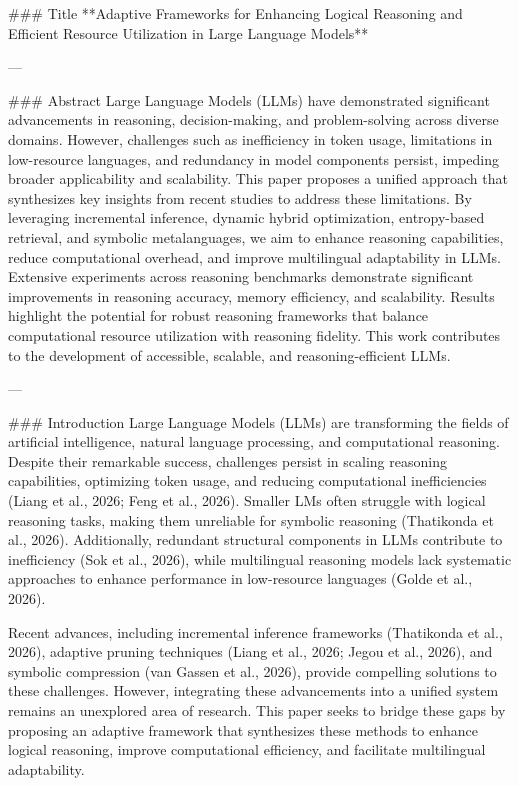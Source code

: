 ### Title  
**Adaptive Frameworks for Enhancing Logical Reasoning and Efficient Resource Utilization in Large Language Models**

---

### Abstract  
Large Language Models (LLMs) have demonstrated significant advancements in reasoning, decision-making, and problem-solving across diverse domains. However, challenges such as inefficiency in token usage, limitations in low-resource languages, and redundancy in model components persist, impeding broader applicability and scalability. This paper proposes a unified approach that synthesizes key insights from recent studies to address these limitations. By leveraging incremental inference, dynamic hybrid optimization, entropy-based retrieval, and symbolic metalanguages, we aim to enhance reasoning capabilities, reduce computational overhead, and improve multilingual adaptability in LLMs. Extensive experiments across reasoning benchmarks demonstrate significant improvements in reasoning accuracy, memory efficiency, and scalability. Results highlight the potential for robust reasoning frameworks that balance computational resource utilization with reasoning fidelity. This work contributes to the development of accessible, scalable, and reasoning-efficient LLMs.

---

### Introduction  
Large Language Models (LLMs) are transforming the fields of artificial intelligence, natural language processing, and computational reasoning. Despite their remarkable success, challenges persist in scaling reasoning capabilities, optimizing token usage, and reducing computational inefficiencies (Liang et al., 2026; Feng et al., 2026). Smaller LMs often struggle with logical reasoning tasks, making them unreliable for symbolic reasoning (Thatikonda et al., 2026). Additionally, redundant structural components in LLMs contribute to inefficiency (Sok et al., 2026), while multilingual reasoning models lack systematic approaches to enhance performance in low-resource languages (Golde et al., 2026).  

Recent advances, including incremental inference frameworks (Thatikonda et al., 2026), adaptive pruning techniques (Liang et al., 2026; Jegou et al., 2026), and symbolic compression (van Gassen et al., 2026), provide compelling solutions to these challenges. However, integrating these advancements into a unified system remains an unexplored area of research. This paper seeks to bridge these gaps by proposing an adaptive framework that synthesizes these methods to enhance logical reasoning, improve computational efficiency, and facilitate multilingual adaptability.  

